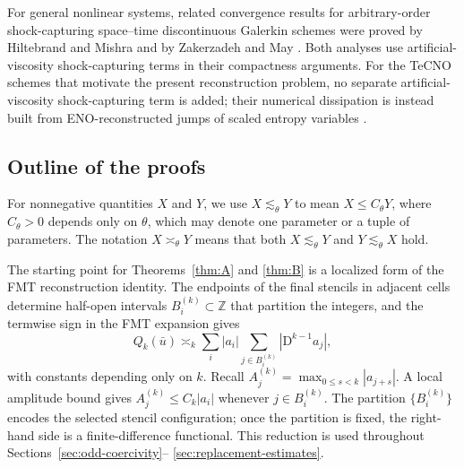 \documentclass[11pt]{amsart}
\theoremstyle{plain}
\theoremstyle{definition}
\theoremstyle{remark}
\numberwithin{equation}{section}
\theoremstyle{plain}
\begin{document}
For general nonlinear systems, related convergence results for
arbitrary-order shock-capturing space--time discontinuous Galerkin schemes
were proved by Hiltebrand and Mishra and by Zakerzadeh and May
\cite{HiltebrandMishra,ZakerzadehMay}.  Both analyses use artificial-viscosity shock-capturing terms in their
compactness arguments.  For the TeCNO schemes \cite{FMTtecno} that motivate the
present reconstruction problem, no separate artificial-viscosity
shock-capturing term is added; their numerical dissipation is instead
built from ENO-reconstructed jumps of scaled entropy variables
\cite{FMTtecno}.


\subsection{Outline of the proofs}\label{sec:intro-proof-strategy}

\leavevmode
For nonnegative quantities $X$ and $Y$, we use
$X\lesssim_\theta Y$ to mean $X\le C_\theta Y$, where $C_\theta>0$ depends
only on $\theta$, which may denote one parameter or a tuple of parameters.
The notation $X\asymp_\theta Y$ means that both $X\lesssim_\theta Y$ and
$Y\lesssim_\theta X$ hold.

The starting point for Theorems~\ref{thm:A} and \ref{thm:B} is a localized
form of the FMT reconstruction identity.  The endpoints of the final stencils
in adjacent cells determine half-open intervals
$B_i^{(k)}\subset\mathbb Z$ that partition the integers, and the termwise sign
in the FMT expansion gives
\begin{equation}\label{eq:intro-source-equivalence}
	Q_k(\bar u)\asymp_k
	\sum_i |a_i|\sum_{j\in B_i^{(k)}}
	|\mathrm D^{k-1}a_j|,
\end{equation}
with constants depending only on $k$.  Recall
$A_j^{(k)}=\max_{0\le s<k}|a_{j+s}|$.  A local amplitude bound gives
$A_j^{(k)}\le C_k|a_i|$ whenever $j\in B_i^{(k)}$.  The partition
$\{B_i^{(k)}\}$ encodes the selected stencil configuration; once the partition is fixed,
the right-hand side is a finite-difference functional.  This reduction is used
throughout Sections~\ref{sec:odd-coercivity}--
\ref{sec:replacement-estimates}.
\end{document}
